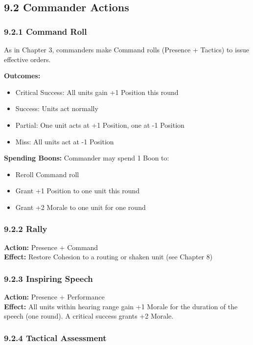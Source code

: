 \documentclass[11pt]{article}
\begin{document}
\subsection{9.2 Commander Actions}

\subsubsection{9.2.1 Command Roll}

As in Chapter 3, commanders make Command rolls (Presence + Tactics) to issue effective orders.

\textbf{Outcomes:}
\begin{itemize}
  \item Critical Success: All units gain +1 Position this round
  \item Success: Units act normally
  \item Partial: One unit acts at +1 Position, one at -1 Position
  \item Miss: All units act at -1 Position
\end{itemize}

\textbf{Spending Boons:} Commander may spend 1 Boon to:
\begin{itemize}
  \item Reroll Command roll
  \item Grant +1 Position to one unit this round
  \item Grant +2 Morale to one unit for one round
\end{itemize}

\subsubsection{9.2.2 Rally}

\textbf{Action:} Presence + Command\\
\textbf{Effect:} Restore Cohesion to a routing or shaken unit (see Chapter 8)

\subsubsection{9.2.3 Inspiring Speech}

\textbf{Action:} Presence + Performance\\
\textbf{Effect:} All units within hearing range gain +1 Morale for the duration of the speech (one round). A critical success grants +2 Morale.

\subsubsection{9.2.4 Tactical Assessment}
\end{document}
